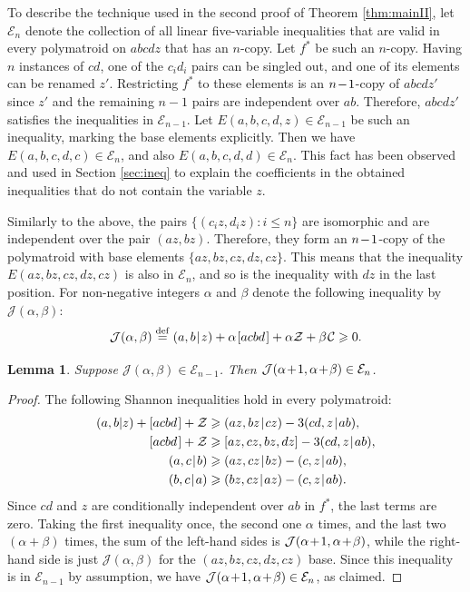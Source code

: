 \documentclass[reqno]{amsart}
\newtheorem{lemma}[theorem]{Lemma}
\theoremstyle{definition}
\newcommand\tsp{\mkern 1.5mu}
\def\|{\mkern1.5mu{|}\mkern1.5mu}
\renewcommand\ge{\geqslant}\renewcommand\le{\leqslant}
\newcommand\C{\mathcal C}
\newcommand\J{\mathcal J} %
\newcommand\Z{\mathcal Z} %
\newcommand\eqdef{\stackrel{\mathrm{def}}{=}}
\def\m#1{\tsp{#1}\tsp}
\def\acbd{[acbd\tsp]}
\begin{document}
To describe the technique used in the second proof of Theorem
\ref{thm:mainII}, let $\mathcal E_n$ denote the collection of all linear
five-variable inequalities that are valid in every polymatroid on $abcdz$
that has an $n$-copy. Let $f^*$ be such an $n$-copy. Having $n$ instances of
$cd$, one of the $c_id_i$ pairs can be singled out, and one of its elements
can be renamed $z'$. Restricting $f^*$ to these elements is an $n\m-1$-copy
of $abcdz'$ since $z'$ and the remaining $n-1$ pairs are independent over
$ab$. Therefore, $abcdz'$ satisfies the inequalities in $\mathcal E_{n-1}$.
Let $E(a,b,c,d,z)\in\mathcal E_{n-1}$ be such an inequality, marking the
base elements explicitly. Then we have $E(a,b,c,d,c)\in \mathcal E_n$, and
also $E(a,b,c,d,d) \in \mathcal E_n$. This fact has been observed and used
in Section \ref{sec:ineq} to explain the coefficients in the obtained
inequalities that do not contain the variable $z$.

Similarly to the above, the pairs $\{(c_iz,d_iz):i\le n\}$ are isomorphic
and are independent over the pair $(az,bz)$. Therefore, they form an
$n\m-1$-copy of the polymatroid with base elements $\{az,bz,cz,dz,cz\}$.
This means that the inequality $E(az,bz,cz,dz,cz)$ is also in $\mathcal
E_n$, and so is the inequality with $dz$ in the last position.
%
For non-negative integers $\alpha$ and $\beta$ denote the following
inequality by $\J(\alpha,\beta)$:
$$
   \J(\alpha,\beta) \eqdef (a,b\|z) +\alpha\tsp\acbd + \alpha\Z + \beta\tsp\C \ge 0.
$$

\begin{lemma}\label{lemma:Jalphabeta}
Suppose $\J(\alpha,\beta)\in\mathcal E_{n-1}$. Then
$\J(\alpha\m+1,\alpha\m+\beta)\in\mathcal E_n$.
\end{lemma}
\begin{proof}
The following Shannon inequalities hold in every polymatroid:
\begin{align*}
  (a,b|z)+\acbd + \Z &\ge (az,bz\|cz)-3(cd,z\|ab),\\
  \acbd + \Z &\ge [az,cz,bz,dz] -3(cd,z\|ab),\\
    (a,c\|b) &\ge (az,cz\|bz) - (c,z\|ab),\\
    (b,c\|a) &\ge (bz,cz\|az) -(c,z\|ab).
\end{align*}
Since $cd$ and $z$ are conditionally independent over $ab$ in $f^*$, the
last terms are zero. Taking the first inequality once, the second one
$\alpha$ times, and the last two $(\alpha+\beta)$ times, the sum of the
left-hand sides is $\J(\alpha\m+1,\alpha\m+\beta)$, while the right-hand
side is just $\J(\alpha,\beta)$ for the $(az,bz,cz,dz,cz)$ base. Since this
inequality is in $\mathcal E_{n-1}$ by assumption, we have
$\J(\alpha\m+1,\alpha\m+\beta)\in\mathcal E_n$, as claimed.
\end{proof}
\end{document}
